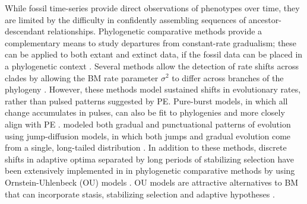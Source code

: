While fossil time-series provide direct observations of phenotypes over time, they are limited by the difficulty in confidently assembling sequences of ancestor-descendant relationships. Phylogenetic comparative methods provide a complementary means to study departures from constant-rate gradualism; these can be applied to both extant and extinct data, if the fossil data can be placed in a phylogenetic context \citep{PennellHarmon}. Several methods allow the detection of rate shifts across clades by allowing the BM rate parameter $\sigma^2$ to differ across branches of the phylogeny \citep[e.g.,][]{Omeara2006, Eastman2011, Slater2012MECCA}. However, these methods model sustained shifts in evolutionary rates, rather than pulsed patterns suggested by PE. Pure-burst models, in which all change accumulates in pulses, can also be fit to phylogenies and more closely align with PE \citep{HansenMartins1996, Khaitovich2005, Uyeda2011}. \citet{Landis2012} modeled both gradual and punctuational patterns of evolution using jump-diffusion models, in which both jumps and gradual evolution come from a single, long-tailed distribution \citep[see also,][]{Eastmanjump}. In addition to these methods, discrete shifts in adaptive optima separated by long periods of stabilizing selection have been extensively implemented in in phylogenetic comparative methods by using Ornstein-Uhlenbeck (OU) models \citep{Felsenstein1988, Hansen1997, ButlerKing2004}. OU models are attractive alternatives to BM that can incorporate stasis, stabilizing selection and adaptive hypotheses \citep[][see \textsc{box 1} for further details]{PennellHarmon}. 

